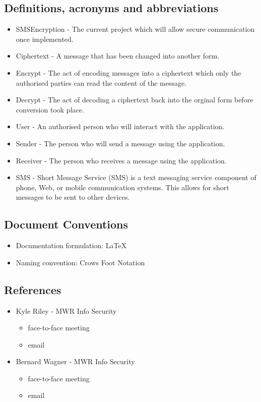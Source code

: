 \subsection{Definitions, acronyms and abbreviations}
\begin{itemize}
\item SMSEncryption - The current project which will allow secure communication once implemented.
\item Ciphertext - A message that has been changed into another form.
\item Encrypt - The act of encoding messages into a ciphertext which only the authorised parties can read the content of the message.
\item Decrypt - The act of decoding a ciphertext back into the orginal form before conversion took place.
\item User - An authorised person who will interact with the application.
\item Sender - The person who will send a message using the application.
\item Receiver - The person who receives a message using the application.
\item SMS - Short Message Service (SMS) is a text messaging service component of phone, Web, or mobile communication systems. This allows for short messages to be sent to other devices.
\end{itemize}

\subsection{Document Conventions}
\begin{itemize}
\item Documentation formulation: LaTeX
\item Naming convention: Crows Foot Notation
\end{itemize}

\subsection{References}
\begin{itemize}
\item{Kyle Riley - MWR Info Security}
\begin{itemize}
\item face-to-face meeting
\item email
\end{itemize}

\item{Bernard Wagner - MWR Info Security}
\begin{itemize}
\item face-to-face meeting
\item email
\end{itemize}
\end{itemize}

